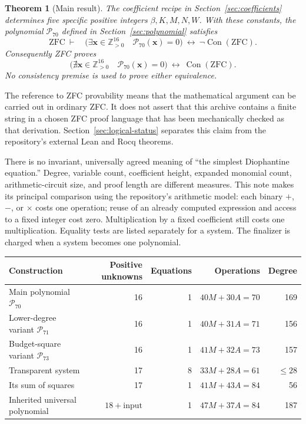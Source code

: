 \documentclass[11pt]{article}
\newtheorem{theorem}{Theorem}[section]
\theoremstyle{definition}
\newcommand{\Pos}{\mathbb Z_{>0}}
\newcommand{\Con}{\operatorname{Con}}
\newcommand{\norms}{\mathcal P}
\begin{document}
\begin{theorem}[Main result]\label{thm:main}
The coefficient recipe in Section~\ref{sec:coefficients} determines five
specific positive integers $\beta,K,M,N,W$. With these constants, the
polynomial $\norms_{70}$ defined in Section~\ref{sec:polynomial} satisfies
\[
 \mathrm{ZFC}\ \vdash\quad
 \bigl(\exists\mathbf x\in\Pos^{16}\quad
       \norms_{70}(\mathbf x)=0\bigr)
 \ \longleftrightarrow\ \neg\Con(\mathrm{ZFC}).
\]
Consequently ZFC proves
\[
 \boxed{\quad
 \bigl(\nexists\mathbf x\in\Pos^{16}\quad
       \norms_{70}(\mathbf x)=0\bigr)
 \ \longleftrightarrow\ \Con(\mathrm{ZFC}).\quad}
\]
No consistency premise is used to prove either equivalence.
\end{theorem}

The reference to ZFC provability means that the mathematical argument can be
carried out in ordinary ZFC. It does not assert that this archive contains a
finite string in a chosen ZFC proof language that has been mechanically
checked as that derivation. Section~\ref{sec:logical-status} separates this
claim from the repository's external Lean and Rocq theorems.

There is no invariant, universally agreed meaning of ``the simplest
Diophantine equation.'' Degree, variable count, coefficient height, expanded
monomial count, arithmetic-circuit size, and proof length are different
measures. This note makes its principal comparison using the repository's
arithmetic model: each binary $+$, $-$, or $\times$ costs one operation;
reuse of an already computed expression and access to a fixed integer cost
zero. Multiplication by a fixed coefficient still costs one multiplication.
Equality tests are listed separately for a system. The finalizer is charged
when a system becomes one polynomial.

\begin{center}
\begin{tabular}{lrrrr}
\toprule
Construction & Positive unknowns & Equations & Operations & Degree\\
\midrule
Main polynomial $\norms_{70}$ & 16 & 1 & $40M+30A=70$ & 169\\
Lower-degree variant $\norms_{71}$ & 16 & 1 & $40M+31A=71$ & 156\\
Budget-square variant $\norms_{73}$ & 16 & 1 & $41M+32A=73$ & 157\\
Transparent system & 17 & 8 & $33M+28A=61$ & $\leq28$\\
Its sum of squares & 17 & 1 & $41M+43A=84$ & 56\\
Inherited universal polynomial & $18+\text{input}$ & 1 & $47M+37A=84$ & 187\\
\bottomrule
\end{tabular}
\end{center}
\end{document}
